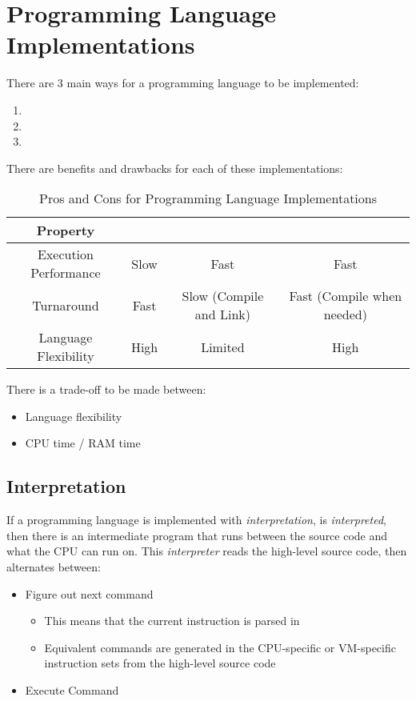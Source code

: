 \section{Programming Language Implementations}\label{sec:Lang_Implementations}
There are 3 main ways for a programming language to be implemented:
\begin{enumerate}[noitemsep]
\item {}
\item {}
\item {}
\end{enumerate}

There are benefits and drawbacks for each of these implementations:
\begin{table}[h!]
  \centering
  \begin{tabular}{cccc}
    \toprule
    Property & \nameref{subsec:Interpretation} & \nameref{subsec:Compilation} & \nameref{subsec:Hybrid_Implementation} \\
    \midrule
    Execution Performance & Slow & Fast & Fast \\
    Turnaround & Fast & Slow (Compile and Link) & Fast (Compile when needed) \\
    Language Flexibility & High & Limited & High \\
    \bottomrule
  \end{tabular}
  \caption{Pros and Cons for Programming Language Implementations}
  \label{tab:Lang_Implementations_Pros_Cons}
\end{table}

There is a trade-off to be made between:
\begin{itemize}[noitemsep]
\item Language flexibility
\item CPU time / RAM time
\end{itemize}

\subsection{Interpretation}\label{subsec:Interpretation}
\begin{definition}[Interpretation]\label{def:Interpretation}
  If a programming language is implemented with \emph{interpretation}, is \emph{interpreted}, then there is an intermediate program that runs between the source code and what the CPU can run on.
  This \emph{interpreter} reads the high-level source code, then alternates between:
  \begin{itemize}[noitemsep]
  \item Figure out next command
    \begin{itemize}[noitemsep]
    \item This means that the current instruction is parsed in
    \item Equivalent commands are generated in the CPU-specific or VM-specific instruction sets from the high-level source code
    \end{itemize}
  \item Execute Command
  \end{itemize}
\end{definition}

